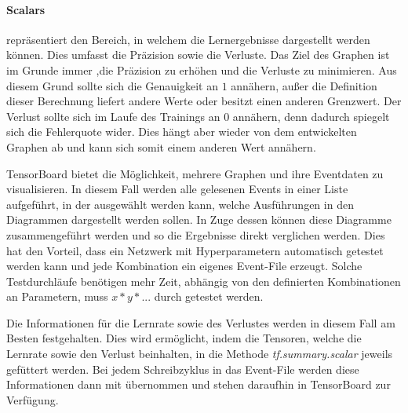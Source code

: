 \paragraph{Scalars} repräsentiert den Bereich, in welchem die Lernergebnisse dargestellt werden können. 
Dies umfasst die Präzision sowie die Verluste. 
Das Ziel des Graphen ist im Grunde immer ,die Präzision zu erhöhen und die Verluste zu minimieren. 
Aus diesem Grund sollte sich die Genauigkeit an $1$ annähern, außer die Definition dieser Berechnung liefert andere Werte oder besitzt einen anderen Grenzwert. 
Der Verlust sollte sich im Laufe des Trainings an $0$ annähern, denn dadurch spiegelt sich die Fehlerquote wider. 
Dies hängt aber wieder von dem entwickelten Graphen ab und kann sich somit einem anderen Wert annähern.
\phantom \newline

\noindent
TensorBoard bietet die Möglichkeit, mehrere Graphen und ihre Eventdaten zu visualisieren. 
In diesem Fall werden alle gelesenen Events in einer Liste aufgeführt, in der ausgewählt werden kann, welche Ausführungen in den Diagrammen dargestellt werden sollen. 
In Zuge dessen können diese Diagramme zusammengeführt werden und so die Ergebnisse direkt verglichen werden. 
Dies hat den Vorteil, dass ein Netzwerk mit Hyperparametern automatisch getestet werden kann und jede Kombination ein eigenes Event-File erzeugt. 
Solche Testdurchläufe benötigen mehr Zeit, abhängig von den definierten Kombinationen an Parametern, muss $x * y * ...$ durch getestet werden.
\phantom \newline

\noindent
Die Informationen für die Lernrate sowie des Verlustes werden in diesem Fall am Besten festgehalten. 
Dies wird ermöglicht, indem die Tensoren, welche die Lernrate sowie den Verlust beinhalten, in die Methode \textit{tf.summary.scalar} jeweils gefüttert werden. 
Bei jedem Schreibzyklus in das Event-File werden diese Informationen dann mit übernommen und stehen daraufhin in TensorBoard zur Verfügung.


